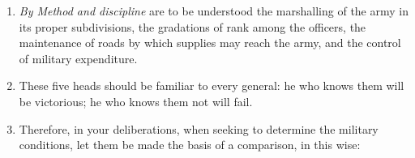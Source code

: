 \documentclass[10pt,a4paper]{book}
\begin{document}
\begin{enumerate}[leftmargin=*, label=\arabic*., wide=0pt, resume]

\item \textit{By Method and discipline} are to be understood the marshalling of the army in its proper subdivisions, the gradations of rank among the officers, the maintenance of roads by which supplies may reach the army, and the control of military expenditure.

\item These five heads should be familiar to every general: he who knows them will be victorious; he who knows them not will fail.

\item Therefore, in your deliberations, when seeking to determine the military conditions, let them be made the basis of a comparison, in this wise:\textemdash

\end{enumerate}
\end{document}

